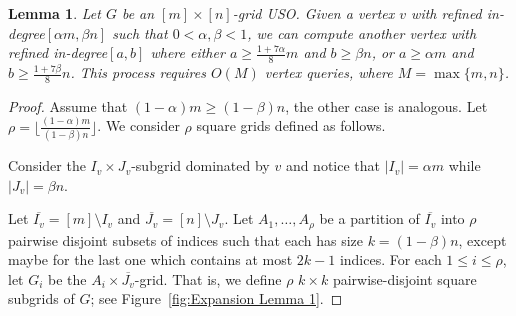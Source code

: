 \documentclass[a4paper,10pt]{article}
\newtheorem{lemma}{Lemma}
\newcommand{\indegree}{refined in-degree\xspace}
\begin{document}
\begin{lemma}\label{lemma:Constant fraction improvement}
Let $G$ be an $[m]\times[n]$-grid USO. 
Given a vertex $v$ with \indegree $[\alpha m, \beta n]$ such that $0 < \alpha, \beta < 1$, we can compute another vertex with \indegree $[a,b]$ where either $a\geq \frac{1+7\alpha}{8}m$ and $b \geq \beta n$, or $a \geq \alpha m$ and $b \geq \frac{1 + 7\beta}{8}n$. This process requires $O(M)$ vertex queries, where $M = \max\{m,n\}$.
\end{lemma}

\begin{proof}
Assume that $(1-\alpha) m \geq (1-\beta)n$, the other case is analogous. 
Let $\rho = \lfloor \frac{(1-\alpha)m}{(1-\beta)n} \rfloor$.
We consider $\rho$ square grids defined as follows. 

Consider the  $I_v\times J_v$-subgrid dominated by $v$ and 
notice that $|I_v| = \alpha m$ while $|J_v| = \beta n$.

Let $\overline{I_v} = [m]\setminus I_v$ and $\overline{J_v} = [n]\setminus J_v$.
Let $A_1, \ldots, A_\rho$ be a partition of $\overline{I_v}$ into $\rho$ pairwise disjoint subsets of indices such that each has size $k = (1-\beta)n$, except maybe for the last one which contains at most $2k-1$ indices.
For each $1\leq i\leq \rho$, let $G_i$ be the $A_i\times \overline{J_v}$-grid. That is, we define $\rho$ $k\times k$ pairwise-disjoint square subgrids of $G$; see Figure~\ref{fig:Expansion Lemma 1}.


\end{proof}
\end{document}

